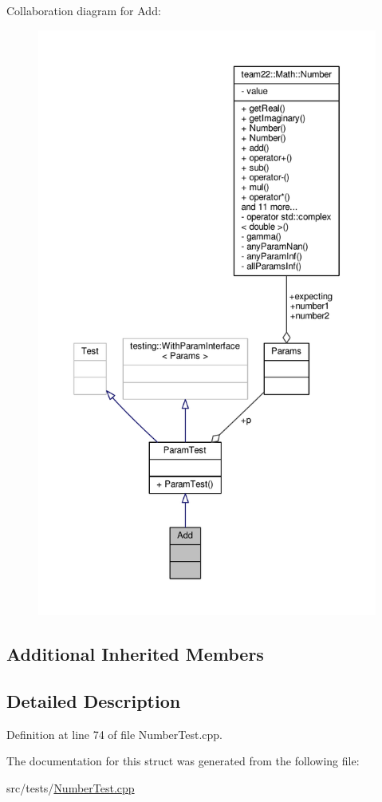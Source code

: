 Collaboration diagram for Add\+:
\nopagebreak
\begin{figure}[H]
\begin{center}
\leavevmode
\includegraphics[height=550pt]{struct_add__coll__graph}
\end{center}
\end{figure}
\subsection*{Additional Inherited Members}


\subsection{Detailed Description}


Definition at line 74 of file Number\+Test.\+cpp.



The documentation for this struct was generated from the following file\+:\begin{DoxyCompactItemize}
\item 
src/tests/\hyperlink{_number_test_8cpp}{Number\+Test.\+cpp}\end{DoxyCompactItemize}
